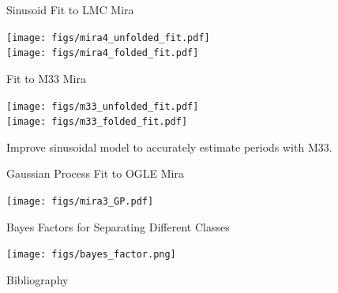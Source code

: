 \documentclass[12pt]{beamer}
\begin{document}
\begin{frame}{Sinusoid Fit to LMC Mira}

\begin{center}
\texttt{[image: figs/mira4\_unfolded\_fit.pdf]}\\
\texttt{[image: figs/mira4\_folded\_fit.pdf]}
\end{center}

\end{frame}


\begin{frame}{Fit to M33 Mira}

\begin{center}
\texttt{[image: figs/m33\_unfolded\_fit.pdf]}\\
\texttt{[image: figs/m33\_folded\_fit.pdf]}
\end{center}

\vspace{.05in}

Improve sinusoidal model to accurately estimate periods with M33.

\end{frame}


\begin{frame}{Gaussian Process Fit to OGLE Mira}
\begin{center}
\texttt{[image: figs/mira3\_GP.pdf]}
\end{center}

\end{frame}


\begin{frame}{Bayes Factors for Separating Different Classes}
\begin{center}
\texttt{[image: figs/bayes\_factor.png]}
\end{center}
\end{frame}


\begin{frame}[allowframebreaks]{Bibliography}
 
  \tiny{
  }
\end{frame}
\end{document}
